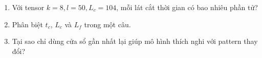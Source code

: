 \begin{selfcheck}
\begin{enumerate}
  \item Với tensor $k=8,l=50,L_c=104$, mỗi lát cắt thời gian có bao nhiêu phần tử?
  \item Phân biệt $t_c$, $L_c$ và $L_f$ trong một câu.
  \item Tại sao chỉ dùng cửa sổ gần nhất lại giúp mô hình thích nghi với pattern thay đổi?
\end{enumerate}
\end{selfcheck}
